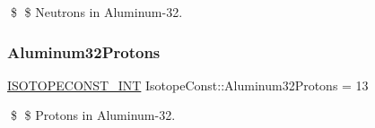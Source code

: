 \$ \$ Neutrons in Aluminum-\/32. \mbox{\label{group___isotope_const-_aluminum-_al32_gacc28681f8e12460ec7ff5bbf3e2d317b}} 
\subsubsection{\texorpdfstring{Aluminum32\+Protons}{Aluminum32Protons}}
{\footnotesize\ttfamily \mbox{\hyperlink{group___isotope_const-_macros_ga5f18360b3e99483a35c32d789e62621c}{I\+S\+O\+T\+O\+P\+E\+C\+O\+N\+S\+T\+\_\+\+I\+NT}} Isotope\+Const\+::\+Aluminum32\+Protons = 13}

\$ \$ Protons in Aluminum-\/32. 